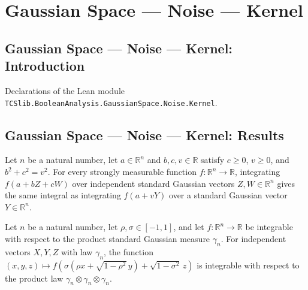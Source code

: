 \section{Gaussian Space --- Noise --- Kernel}
\subsection*{Gaussian Space --- Noise --- Kernel: Introduction}

Declarations of the Lean module \texttt{TCSlib.BooleanAnalysis.GaussianSpace.Noise.Kernel}.

\subsection*{Gaussian Space --- Noise --- Kernel: Results}

\begin{lemma}
\label{BooleanAnalysis.GaussianSpace.integral_gaussian_affine_pair}
\leanok
{}
Let $n$ be a natural number, let $a\in\mathbb R^n$ and $b,c,v\in\mathbb R$ satisfy $c\ge
0$, $v\ge 0$, and $b^2+c^2=v^2$. For every strongly measurable function $f:\mathbb
R^n\to\mathbb R$, integrating $f(a+bZ+cW)$ over independent standard Gaussian vectors
$Z,W\in\mathbb R^n$ gives the same integral as integrating $f(a+vY)$ over a standard
Gaussian vector $Y\in\mathbb R^n$.
\end{lemma}

\begin{lemma}
\label{BooleanAnalysis.GaussianSpace.integrable_gaussianNoise_compose_integrand}
\leanok
{}
Let $n$ be a natural number, let $\rho,\sigma\in[-1,1]$, and let $f:\mathbb
R^n\to\mathbb R$ be integrable with respect to the product standard Gaussian measure
$\gamma_n$. For independent vectors $X,Y,Z$ with law $\gamma_n$, the function
$(x,y,z)\mapsto f\!\left(\sigma(\rho x+\sqrt{1-\rho^2}\,y)+\sqrt{1-\sigma^2}\,z\right)$
is integrable with respect to the product law $\gamma_n\otimes\gamma_n\otimes\gamma_n$.
\end{lemma}

